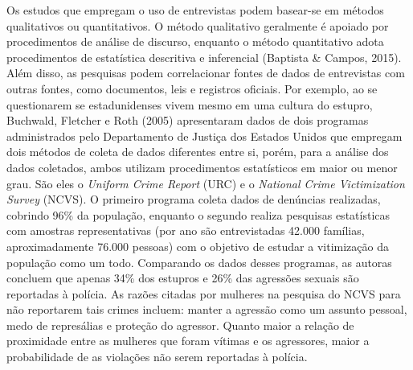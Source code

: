 Os estudos que empregam o uso de entrevistas podem basear-se em métodos qualitativos ou quantitativos. O método qualitativo geralmente é apoiado por procedimentos de análise de discurso, enquanto o método quantitativo adota procedimentos de estatística descritiva e inferencial (Baptista \& Campos, 2015). Além disso, as pesquisas podem correlacionar fontes de dados de entrevistas com outras fontes, como documentos, leis e registros oficiais. Por exemplo, ao se questionarem se estadunidenses vivem mesmo em uma cultura do estupro, Buchwald, Fletcher e Roth (2005) apresentaram dados de dois programas administrados pelo Departamento de Justiça dos Estados Unidos que empregam dois métodos de coleta de dados diferentes entre si, porém, para a análise dos dados coletados, ambos utilizam procedimentos estatísticos em maior ou menor grau. São eles o \textit{Uniform Crime Report} (URC) e o \textit{National Crime Victimization Survey} (NCVS). O primeiro programa coleta dados de denúncias realizadas, cobrindo 96\% da população, enquanto o segundo realiza pesquisas estatísticas com amostras representativas (por ano são entrevistadas 42.000 famílias, aproximadamente 76.000 pessoas) com o objetivo de estudar a vitimização da população como um todo. Comparando os dados desses programas, as autoras concluem que apenas 34\% dos estupros e 26\% das agressões sexuais são reportadas à polícia. As razões citadas por mulheres na pesquisa do NCVS para não reportarem tais crimes incluem: manter a agressão como um assunto pessoal, medo de represálias e proteção do agressor. Quanto maior a relação de proximidade entre as mulheres que foram vítimas e os agressores, maior a probabilidade de as violações não serem reportadas à polícia. 

